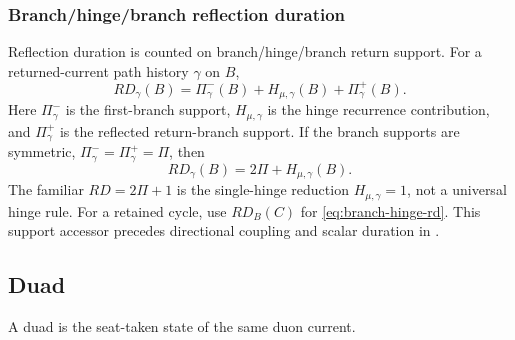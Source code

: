 \subsubsection{Branch/hinge/branch reflection duration}\label{subsec:branch-hinge-rd}
Reflection duration is counted on branch/hinge/branch return support. For a returned-current path history \(\gamma\) on \(B\),
\begin{equation}
RD_\gamma(B)
=
\Pi^-_\gamma(B)
+
H_{\mu,\gamma}(B)
+
\Pi^+_\gamma(B).
\label{eq:branch-hinge-rd}
\end{equation}
Here \(\Pi^-_\gamma\) is the first-branch support, \(H_{\mu,\gamma}\) is the hinge recurrence contribution, and \(\Pi^+_\gamma\) is the reflected return-branch support. If the branch supports are symmetric, \(\Pi^-_\gamma=\Pi^+_\gamma=\Pi\), then
\begin{equation}
RD_\gamma(B)=2\Pi+H_{\mu,\gamma}(B).
\label{eq:branch-hinge-rd-symmetric}
\end{equation}
The familiar \(RD=2\Pi+1\) is the single-hinge reduction \(H_{\mu,\gamma}=1\), not a universal hinge rule. For a retained cycle, use \(RD_B(C)\) for \eqref{eq:branch-hinge-rd}.
This support accessor precedes directional coupling and scalar duration in
.

\subsection{Duad}\label{subsec:duad}
\begin{definition}
A duad is the seat-taken state of the same duon current.
\end{definition}


